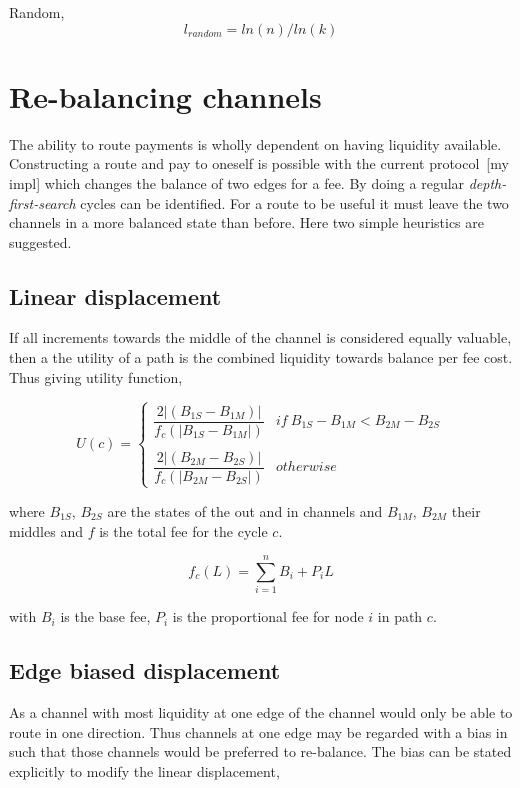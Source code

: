 Random,
\[ l_{random} = ln(n) / ln(k) \]

\section{Re-balancing channels}

The ability to route payments is wholly dependent on having liquidity available. Constructing a route and pay to oneself is possible with the current protocol~[my impl] which changes the balance of two edges for a fee. By doing a regular \textit{depth-first-search} cycles can be identified. For a route to be useful it must leave the two channels in a more balanced state than before. Here two simple heuristics are suggested. 

\subsection{Linear displacement}
\label{sec:linear:displacement}
If all increments towards the middle of the channel is considered equally valuable, then a the utility of a path is the combined liquidity towards balance per fee cost. Thus giving utility function,

\[ U(c) = \begin{cases} 
\dfrac{2|(B_{1S} - B_{1M})|}{f_c(|B_{1S} - B_{1M}|)}  & if~B_{1S} - B_{1M} < B_{2M} - B_{2S} \\ 
\\
\dfrac{2|(B_{2M} - B_{2S})|}{f_c(|B_{2M} - B_{2S}|)}  & otherwise
\end{cases} \]

where $B_{1S}$, $B_{2S}$ are the states of the out and in channels and $B_{1M}$, $B_{2M}$ their middles and $f$ is the total fee for the cycle $c$. 

\[f_c(L) = \sum_{i=1}^{n} B_i + P_iL \]

with $B_i$ is the base fee, $P_i$ is the proportional fee for node $i$ in path $c$.

\subsection{Edge biased displacement}
\label{sec:edge:bias:displacement}

As a channel with most liquidity at one edge of the channel would only be able to route in one direction. Thus channels at one edge may be regarded with a bias in such that those channels would be preferred to re-balance. The bias can be stated explicitly to modify the linear displacement,

